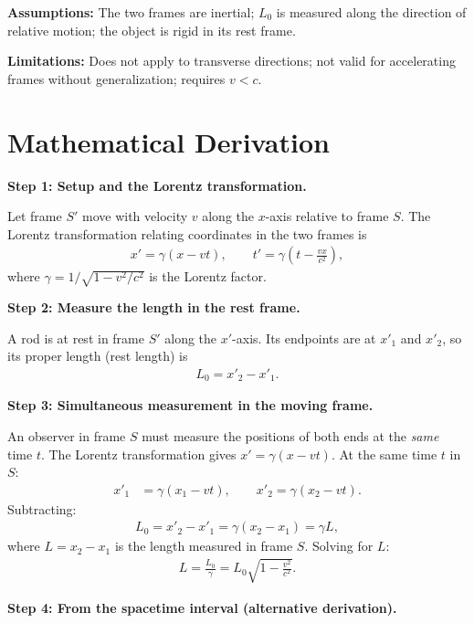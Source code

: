 \textbf{Assumptions:} The two frames are inertial; $L_{0}$ is measured along the direction of relative motion; the object is rigid in its rest frame.


\textbf{Limitations:} Does not apply to transverse directions; not valid for accelerating frames without generalization; requires $v < c$.


\section*{Mathematical Derivation}

\textbf{Step 1: Setup and the Lorentz transformation.}

Let frame $S'$ move with velocity $v$ along the $x$-axis relative to frame $S$. The Lorentz transformation relating coordinates in the two frames is
\begin{align}
x' = \gamma(x - vt), \qquad t' = \gamma\!\left(t - \frac{vx}{c^2}\right),
\end{align}
where $\gamma = 1/\sqrt{1 - v^2/c^2}$ is the Lorentz factor.

\textbf{Step 2: Measure the length in the rest frame.}

A rod is at rest in frame $S'$ along the $x'$-axis. Its endpoints are at $x'_1$ and $x'_2$, so its proper length (rest length) is
\begin{align}
L_0 = x'_2 - x'_1.
\end{align}

\textbf{Step 3: Simultaneous measurement in the moving frame.}

An observer in frame $S$ must measure the positions of both ends at the \emph{same} time $t$. The Lorentz transformation gives $x' = \gamma(x - vt)$. At the same time $t$ in $S$:
\begin{align}
x'_1 &= \gamma(x_1 - vt), \qquad x'_2 = \gamma(x_2 - vt).
\end{align}
Subtracting:
\begin{align}
L_0 = x'_2 - x'_1 = \gamma(x_2 - x_1) = \gamma L,
\end{align}
where $L = x_2 - x_1$ is the length measured in frame $S$. Solving for $L$:
\begin{align}
\boxed{L = \frac{L_0}{\gamma} = L_0\sqrt{1 - \frac{v^2}{c^2}}.}
\end{align}

\textbf{Step 4: From the spacetime interval (alternative derivation).}

